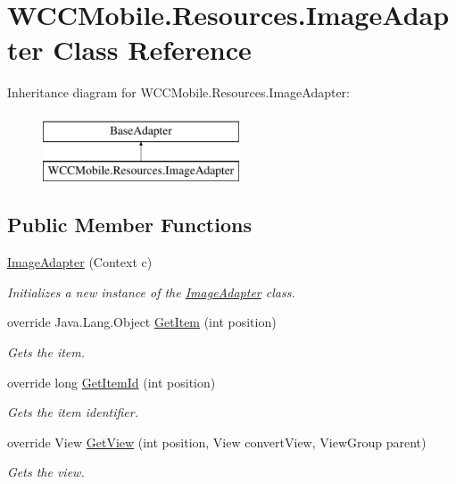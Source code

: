 \hypertarget{class_w_c_c_mobile_1_1_resources_1_1_image_adapter}{}\section{W\+C\+C\+Mobile.\+Resources.\+Image\+Adapter Class Reference}
\label{class_w_c_c_mobile_1_1_resources_1_1_image_adapter}
Inheritance diagram for W\+C\+C\+Mobile.\+Resources.\+Image\+Adapter\+:\begin{figure}[H]
\begin{center}
\leavevmode
\includegraphics[height=2.000000cm]{class_w_c_c_mobile_1_1_resources_1_1_image_adapter}
\end{center}
\end{figure}
\subsection*{Public Member Functions}
\begin{DoxyCompactItemize}
\item 
\hyperlink{class_w_c_c_mobile_1_1_resources_1_1_image_adapter_aecdbda114f8bc3126786559cf2c07df9}{Image\+Adapter} (Context c)
\begin{DoxyCompactList}\small\item\em Initializes a new instance of the \hyperlink{class_w_c_c_mobile_1_1_resources_1_1_image_adapter}{Image\+Adapter} class. \end{DoxyCompactList}\item 
override Java.\+Lang.\+Object \hyperlink{class_w_c_c_mobile_1_1_resources_1_1_image_adapter_a5cd5bc1c3740deb80f83038b0acf2b8c}{Get\+Item} (int position)
\begin{DoxyCompactList}\small\item\em Gets the item. \end{DoxyCompactList}\item 
override long \hyperlink{class_w_c_c_mobile_1_1_resources_1_1_image_adapter_a3d2752b9736fd9110d594f1b445fd973}{Get\+Item\+Id} (int position)
\begin{DoxyCompactList}\small\item\em Gets the item identifier. \end{DoxyCompactList}\item 
override View \hyperlink{class_w_c_c_mobile_1_1_resources_1_1_image_adapter_a5584e8f229629bf756ba434b2834b2e1}{Get\+View} (int position, View convert\+View, View\+Group parent)
\begin{DoxyCompactList}\small\item\em Gets the view. \end{DoxyCompactList}\end{DoxyCompactItemize}
